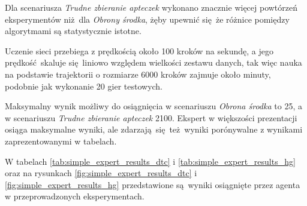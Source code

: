 Dla scenariusza \textit{Trudne zbieranie apteczek} wykonano znacznie więcej powtórzeń eksperymentów niż dla \textit{Obrony środka}, żęby upewnić się że różnice pomiędzy algorytmami są statystycznie istotne.

Uczenie sieci przebiega z prędkością około 100 kroków na sekundę, a jego prędkość skaluje się liniowo względem wielkości zestawu danych, tak więc nauka na podstawie trajektorii o rozmiarze 6000 kroków zajmuje około minuty, podobnie jak wykonanie 20 gier testowych.

Maksymalny wynik możliwy do osiągnięcia w scenariuszu \textit{Obrona środka} to 25, a w scenariuszu \textit{Trudne zbieranie apteczek} 2100. Ekspert w większości prezentacji osiąga maksymalne wyniki, ale zdarzają się też wyniki porónywalne z wynikami zaprezentowanymi w tabelach.

W tabelach \ref{tab:simple_expert_results_dtc} i \ref{tab:simple_expert_results_hg} oraz na rysunkach \ref{fig:simple_expert_results_dtc} i \ref{fig:simple_expert_results_hg} przedstawione są wyniki osiągnięte przez agenta w przeprowadzonych eksperymentach.

\begin{figure}[H]
\end{figure}

